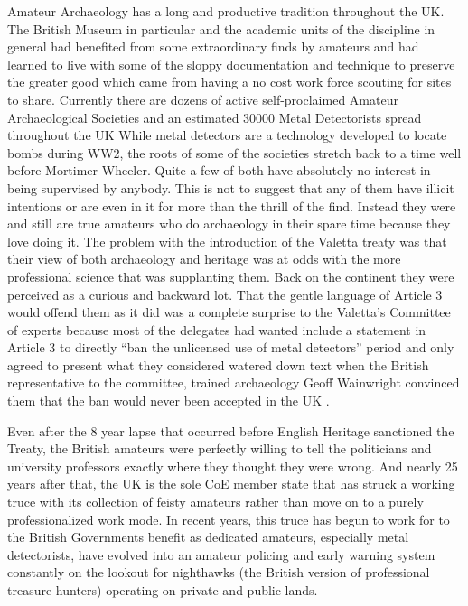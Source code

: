 \documentclass[spanish]{ijsra}
\begin{document}
Amateur Archaeology has a long and productive tradition throughout the UK. The British Museum in particular and the academic units of the discipline in general had benefited from some extraordinary finds by amateurs and had learned to live with some of the sloppy documentation and technique to preserve the greater good which came from having a no cost work force scouting for sites to share. Currently there are dozens of active self-proclaimed Amateur Archaeological Societies and an estimated \num{30000} 
Metal Detectorists spread throughout the UK \parencites{finlo2006}{potts2015}%
While metal detectors are a technology developed to locate bombs during WW2, the roots of some of the societies stretch back to a time well before Mortimer Wheeler. Quite a few of both have absolutely no interest in being supervised by anybody. This is not to suggest that any of them have illicit intentions or are even in it for more than the thrill of the find. Instead they were and still are true amateurs who do archaeology in their spare time because they love doing it. The problem with the introduction of the Valetta treaty was that their view of both archaeology and heritage was at odds with the more professional science that was supplanting them. Back on the continent they were perceived as a curious and backward lot. That the gentle language of Article 3 would offend them as it did was a complete surprise to the Valetta’s Committee of experts because most of the delegates had wanted include a statement in Article 3 to directly “ban the unlicensed use of metal detectors” period and only agreed to present what they considered watered down text when the British representative to the committee, trained archaeology Geoff Wainwright convinced them that the ban would never been accepted in the UK \parencite[62]{willems2007}. 

Even after the \num{8} year lapse that occurred before English Heritage sanctioned the Treaty, the British amateurs were perfectly willing to tell the politicians and university professors exactly where they thought they were wrong. And nearly \num{25} years after that, the UK is the sole CoE member state that has struck a working truce with its collection of feisty amateurs rather than move on to a purely professionalized work mode. In recent years, this truce has begun to work for to the British Governments benefit as dedicated amateurs, especially metal detectorists, have evolved into an amateur policing and early warning system constantly on the lookout for nighthawks (the British version of professional treasure hunters) operating on private and public lands. 
\end{document}
